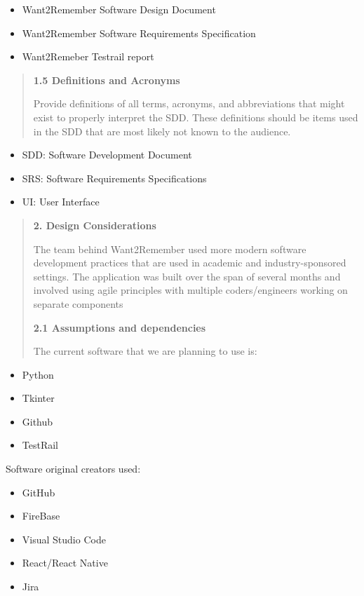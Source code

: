 \documentclass[
]{article}
\begin{document}
\begin{itemize}
\item
  Want2Remember Software Design Document
\item
  Want2Remember Software Requirements Specification
\item
  Want2Remeber Testrail report
\end{itemize}

\begin{quote}
\textbf{1.5 Definitions and Acronyms}

Provide definitions of all terms, acronyms, and abbreviations that might
exist to properly interpret the SDD. These definitions should be items
used in the SDD that are most likely not known to the audience.
\end{quote}

\begin{itemize}
\item
  SDD: Software Development Document
\item
  SRS: Software Requirements Specifications
\item
  UI: User Interface
\end{itemize}

\begin{quote}
\textbf{2. Design Considerations}

The team behind Want2Remember used more modern software development
practices that are used in academic and industry-sponsored settings. The
application was built over the span of several months and involved using
agile principles with multiple coders/engineers working on separate
components

\textbf{2.1 Assumptions and dependencies}

The current software that we are planning to use is:
\end{quote}

\begin{itemize}
\item
  Python
\item
  Tkinter
\item
  Github
\item
  TestRail
\end{itemize}

Software original creators used:

\begin{itemize}
\item
  GitHub
\item
  FireBase
\item
  Visual Studio Code
\item
  React/React Native
\item
  Jira
\end{itemize}
\end{document}
